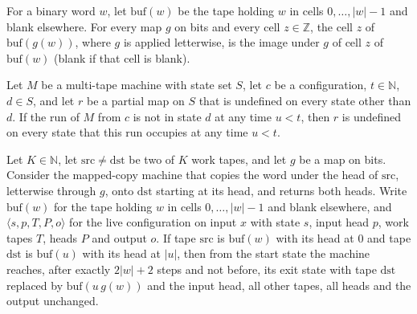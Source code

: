 \begin{theorem}
\label{Turing.NTimeDiag.qy_bufferTape_map}
\leanok
{}
For a binary word $w$, let $\mathrm{buf}(w)$ be the tape holding $w$ in cells
$0, \dots, |w| - 1$ and blank elsewhere. For every map $g$ on bits and every cell
$z \in \mathbb{Z}$, the cell $z$ of $\mathrm{buf}(g(w))$, where $g$ is applied letterwise, is the
image under $g$ of cell $z$ of $\mathrm{buf}(w)$ (blank if that cell is blank).
\end{theorem}

\begin{theorem}
\label{Turing.NTimeDiag.qy_guard_of_cut}
\leanok
{}
Let $M$ be a multi-tape machine with state set $S$, let $c$ be a configuration, $t \in \mathbb{N}$,
$d \in S$, and let $r$ be a partial map on $S$ that is undefined on every state other than $d$.
If the run of $M$ from $c$ is not in state $d$ at any time $u < t$, then $r$ is undefined on
every state that this run occupies at any time $u < t$.
\end{theorem}

\begin{theorem}
\label{Turing.NTimeDiag.qy_copy}
\leanok
{}
Let $K \in \mathbb{N}$, let $\mathrm{src} \ne \mathrm{dst}$ be two of $K$ work tapes, and let $g$
be a map on bits. Consider the mapped-copy machine that copies the word under the head of
$\mathrm{src}$, letterwise through $g$, onto $\mathrm{dst}$ starting at its head, and returns both
heads. Write $\mathrm{buf}(w)$ for the tape holding $w$ in cells $0, \dots, |w| - 1$ and blank
elsewhere, and $\langle s, p, T, P, o\rangle$ for the live configuration on input $x$ with state
$s$, input head $p$, work tapes $T$, heads $P$ and output $o$. If tape $\mathrm{src}$ is
$\mathrm{buf}(w)$ with its head at $0$ and tape $\mathrm{dst}$ is $\mathrm{buf}(u)$ with its head
at $|u|$, then from the start state the machine reaches, after exactly $2|w| + 2$ steps and not
before, its exit state with tape $\mathrm{dst}$ replaced by $\mathrm{buf}(u \, g(w))$ and the
input head, all other tapes, all heads and the output unchanged.
\end{theorem}

